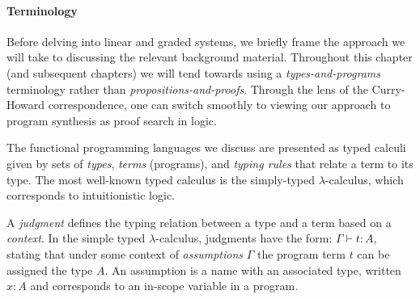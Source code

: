 \begin{table}[htbp]
\begin{tabular}{r l l}
  \bottomrule
\end{tabular}
\end{table}


\paragraph{Terminology}
Before delving into linear and graded systems, we briefly frame the approach
we will take to discussing the relevant background material. Throughout this
chapter (and subsequent chapters) we will tend towards using a
\textit{types-and-programs} terminology rather than
\textit{propositions-and-proofs}. Through the lens of the Curry-Howard
correspondence, one can switch smoothly to viewing our approach to program
synthesis as proof search in logic.

The functional programming languages we discuss are presented as typed
calculi given by sets of \textit{types}, \textit{terms} (programs), and \textit{typing
 rules} that relate a term to its type. The most well-known typed
calculus is the simply-typed $\lambda$-calculus, which corresponds to
intuitionistic logic.

A \textit{judgment} defines the typing relation between a type and a term based on a
\textit{context}. In the simple typed $\lambda$-calculus, judgments have the
form: $\Gamma \vdash t : A$, stating that under some context of
\textit{assumptions} $\Gamma$ the program term $t$ can be assigned the type $A$.
An assumption is a name with an associated type, written $x : A$ and
corresponds to an in-scope variable in a program.

